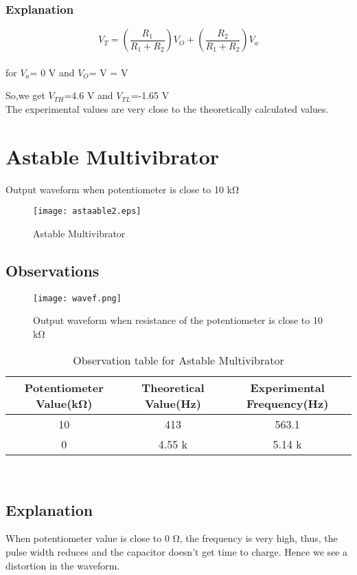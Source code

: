 \documentclass[12pt]{article}
\begin{document}
\subsubsection{Explanation}

\begin{equation}
     V_{T}=(\frac{R_{1}}{R_{1} + R_{2}})V_{O} + (\frac{R_{2}}{R_{1}+R_{2}})V_{a}
\end{equation} 
\\for $V_{a}$= 0 V and $V_{O}$= V  =  V

So,we get $V_{TH}$=4.6 V and $V_{TL}$=-1.65 V
\\The experimental values are very close to the theoretically calculated values.
\newpage
\section{Astable Multivibrator}

Output waveform when potentiometer is close to 10 k\si{\ohm}



\begin{figure}[h]
  \centering
  \texttt{[image: astaable2.eps]}  %
  \caption{Astable Multivibrator}
\end{figure}

\subsection{Observations}
\begin{figure}[h]
  \centering
  \texttt{[image: wavef.png]}  %
  \caption{Output waveform when resistance of the potentiometer is close to 10 k\si{\ohm}}
\end{figure}

\newpage
%
%
\begin{table}[h]
\centering  %
\begin{tabular}{|c | c| c|} %
\hline  %
Potentiometer Value(k\si{\ohm}) & Theoretical Value(Hz) & Experimental Frequency(Hz) \\  %
\hline  %
10    & 413 & 563.1 \\  %
0    & 4.55 k & 5.14 k \\  %
\hline	%
\end{tabular}
\caption{Observation table for Astable Multivibrator}
\end{table}
\\
\subsection{Explanation}
When potentiometer value is close to 0 \si{\ohm}, the frequency is very high, thus, the pulse width
reduces and the capacitor doesn't get time to charge. Hence we see a distortion in the
waveform.
\end{document}
